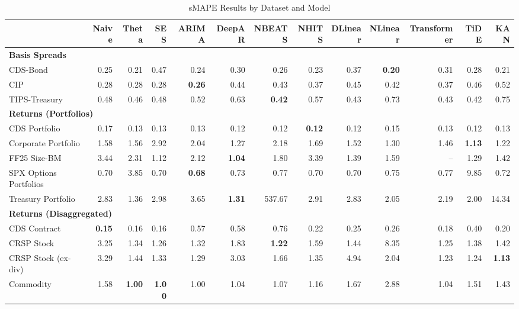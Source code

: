
\begin{table}[htbp]
\centering
\caption{sMAPE Results by Dataset and Model}
\label{tab:smape_results}
\scriptsize
\setlength{\tabcolsep}{1.5pt}
\renewcommand{\arraystretch}{0.9}
\begin{tabular}{@{}lrrrrrrrrrrrr@{}}
\toprule
 & Naive & Theta & SES & ARIMA & DeepAR & NBEATS & NHITS & DLinear & NLinear & Transformer & TiDE & KAN \\
\midrule
\multicolumn{13}{l}{\textbf{Basis Spreads}} \\
CDS-Bond & 0.25 & 0.21 & 0.47 & 0.24 & 0.30 & 0.26 & 0.23 & 0.37 & \textbf{0.20} & 0.31 & 0.28 & 0.21 \\
CIP & 0.28 & 0.28 & 0.28 & \textbf{0.26} & 0.44 & 0.43 & 0.37 & 0.45 & 0.42 & 0.37 & 0.46 & 0.52 \\
TIPS-Treasury & 0.48 & 0.46 & 0.48 & 0.52 & 0.63 & \textbf{0.42} & 0.57 & 0.43 & 0.73 & 0.43 & 0.42 & 0.75 \\
\midrule
\multicolumn{13}{l}{\textbf{Returns (Portfolios)}} \\
CDS Portfolio & 0.17 & 0.13 & 0.13 & 0.13 & 0.12 & 0.12 & \textbf{0.12} & 0.12 & 0.15 & 0.13 & 0.12 & 0.13 \\
Corporate Portfolio & 1.58 & 1.56 & 2.92 & 2.04 & 1.27 & 2.18 & 1.69 & 1.52 & 1.30 & 1.46 & \textbf{1.13} & 1.22 \\
FF25 Size-BM & 3.44 & 2.31 & 1.12 & 2.12 & \textbf{1.04} & 1.80 & 3.39 & 1.39 & 1.59 & -- & 1.29 & 1.42 \\
SPX Options Portfolios & 0.70 & 3.85 & 0.70 & \textbf{0.68} & 0.73 & 0.77 & 0.70 & 0.70 & 0.75 & 0.77 & 9.85 & 0.72 \\
Treasury Portfolio & 2.83 & 1.36 & 2.98 & 3.65 & \textbf{1.31} & 537.67 & 2.91 & 2.83 & 2.05 & 2.19 & 2.00 & 14.34 \\
\midrule
\multicolumn{13}{l}{\textbf{Returns (Disaggregated)}} \\
CDS Contract & \textbf{0.15} & 0.16 & 0.16 & 0.57 & 0.58 & 0.76 & 0.22 & 0.25 & 0.26 & 0.18 & 0.40 & 0.20 \\
CRSP Stock & 3.25 & 1.34 & 1.26 & 1.32 & 1.83 & \textbf{1.22} & 1.59 & 1.44 & 8.35 & 1.25 & 1.38 & 1.42 \\
CRSP Stock (ex-div) & 3.29 & 1.44 & 1.33 & 1.29 & 3.03 & 1.66 & 1.35 & 4.94 & 2.04 & 1.23 & 1.24 & \textbf{1.13} \\
Commodity & 1.58 & \textbf{1.00} & \textbf{1.00} & 1.00 & 1.04 & 1.07 & 1.16 & 1.67 & 2.88 & 1.04 & 1.51 & 1.43 \\

\end{tabular}
\end{table}
